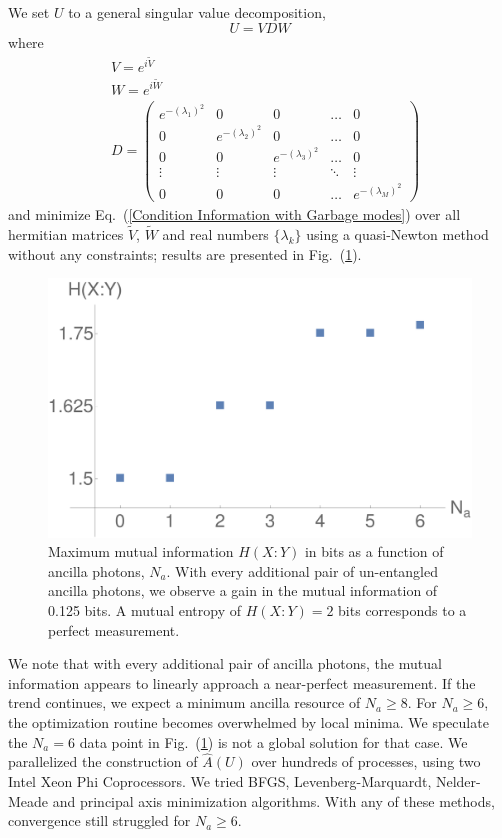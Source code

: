 \documentclass[aps,pra,twocolumn,showpacs,superscriptaddress,floatfix,10pt]{revtex4}
\begin{document}
We set $U$ to a general singular value decomposition,
\begin{equation}
	\label{Singular Value Decomposition}
	U = V D W
\end{equation}
where
\begin{eqnarray}
	& V = e^{i \tilde{V}} \\
	& W = e^{i \tilde{W}} \\
	& D =  \begin{pmatrix} e^{-(\lambda_1)^2} & 0 & 0 & \hdots & 0 \\ 0 & e^{-(\lambda_2)^2} & 0 & \hdots & 0 \\ 0 & 0 & e^{-(\lambda_3)^2} & \hdots & 0 \\ \vdots
	& \vdots & \vdots & \ddots & \vdots \\
	0 & 0 & 0 & \hdots & e^{-(\lambda_M)^2} \end{pmatrix} 
\end{eqnarray}
and minimize Eq.~(\ref{Condition Information with Garbage modes}) over all hermitian matrices $\tilde{V}$, $\tilde{W}$ and real numbers $\{\lambda_k\}$ using a quasi-Newton method without any constraints; results are presented in Fig.~(\ref{Mutual Information Results}).
\begin{figure}[ht]
	\centering
	\includegraphics[width= 0.48 \textwidth]{./EntropyData.pdf}
	\caption{ Maximum mutual information $H(X:Y)$ in bits as a function of ancilla photons, $N_a$. With every additional pair of un-entangled ancilla photons, we observe a gain in the mutual information of 0.125 bits. A mutual entropy of $H(X:Y) = 2$ bits corresponds to a perfect measurement.}
	\label{Mutual Information Results}
\end{figure}
We note that with every additional pair of ancilla photons, the mutual information appears to linearly approach a near-perfect measurement. If the trend continues, we expect a minimum ancilla resource of $N_a \ge 8$. For $N_a \ge 6$, the optimization routine becomes overwhelmed by local minima. We speculate the $N_a=6$ data point in Fig.~(\ref{Mutual Information Results}) is not a global solution for that case. We parallelized the construction of $\hat{A}(U)$ over hundreds of processes, using two Intel Xeon Phi Coprocessors. We tried BFGS, Levenberg-Marquardt, Nelder-Meade and principal axis minimization algorithms. With any of these methods, convergence still struggled for $N_a \ge 6$.
\end{document}
